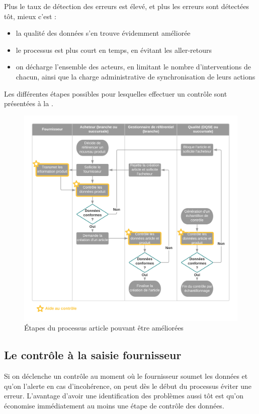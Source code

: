         Plus le taux de détection des erreurs est élevé, et plus les erreurs sont détectées tôt, mieux c'est : 
        \begin{itemize}
            \item la qualité des données s'en trouve évidemment améliorée
            \item le processus est plus court en temps, en évitant les aller-retours
            \item on décharge l'ensemble des acteurs, en limitant le nombre d'interventions de chacun, ainsi que la charge administrative de synchronisation de leurs actions             
        \end{itemize}
        Les différentes étapes possibles pour lesquelles effectuer un contrôle sont présentées à la .

        \begin{figure}[htbp]
            \begin{center}
            \includegraphics[width=0.9\linewidth]{img/Processus_de_creation_article_avec_aide_au_controle.png}
            \end{center}
            \caption{\'{E}tapes du processus article pouvant être améliorées}
            \label{fig:processus_article_aide_ctrle}
        \end{figure}    

            \subsection{Le contrôle à la saisie fournisseur}
            Si on déclenche un contrôle au moment où le fournisseur soumet les données et qu'on l'alerte en cas d'incohérence, on peut dès le début du processus éviter une erreur.
            L'avantage d'avoir une identification des problèmes aussi tôt est qu'on économise immédiatement au moins une étape de contrôle des données.

